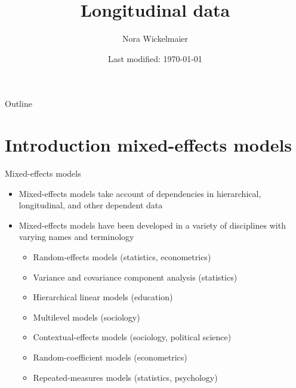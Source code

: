 \documentclass[aspectratio=169]{beamer}
\title{Longitudinal data}
\author{Nora Wickelmaier}
\date{Last modified: \today}
\begin{document}
\begin{frame}{}
\thispagestyle{empty}
\titlepage
\end{frame}

\begin{frame}{Outline}
\tableofcontents
\end{frame}

\section[Introduction]{Introduction mixed-effects models}

\begin{frame}{Mixed-effects models}
\begin{itemize}
  \item Mixed-effects models take account of dependencies in hierarchical,
    longitudinal, and other dependent data
  \item Mixed-effects models have been developed in a variety of
    disciplines with varying names and terminology
  \begin{itemize}
    \item Random-effects models (statistics, econometrics)
    \item Variance and covariance component analysis (statistics)
    \item Hierarchical linear models (education)
    \item Multilevel models (sociology)
    \item Contextual-effects models (sociology, political science)
    \item Random-coefficient models (econometrics)
    \item Repeated-measures models (statistics, psychology)
  \end{itemize}
\end{itemize}
  \begin{flushright}{\footnotesize \citet{Fox2016}}\end{flushright}
\end{frame}
\end{document}
